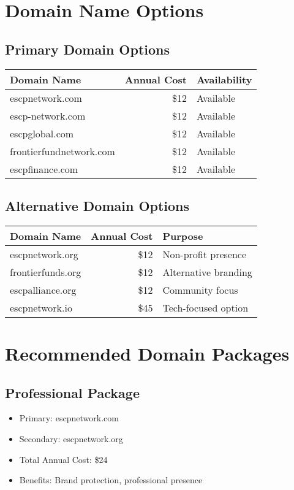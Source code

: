 \documentclass[11pt,a4paper]{article}
\begin{document}
\section{Domain Name Options}

\subsection{Primary Domain Options}
\begin{tcolorbox}[colback=white,colframe=primaryBlue!20]
\begin{tabular}{lrl}
\toprule
\textbf{Domain Name} & \textbf{Annual Cost} & \textbf{Availability} \\
\midrule
escpnetwork.com & \$12 & Available \\
escp-network.com & \$12 & Available \\
escpglobal.com & \$12 & Available \\
frontierfundnetwork.com & \$12 & Available \\
escpfinance.com & \$12 & Available \\
\bottomrule
\end{tabular}
\end{tcolorbox}

\subsection{Alternative Domain Options}
\begin{tcolorbox}[colback=white,colframe=primaryBlue!20]
\begin{tabular}{lrl}
\toprule
\textbf{Domain Name} & \textbf{Annual Cost} & \textbf{Purpose} \\
\midrule
escpnetwork.org & \$12 & Non-profit presence \\
frontierfunds.org & \$12 & Alternative branding \\
escpalliance.org & \$12 & Community focus \\
escpnetwork.io & \$45 & Tech-focused option \\
\bottomrule
\end{tabular}
\end{tcolorbox}

\section{Recommended Domain Packages}

\subsection{Professional Package}
\begin{tcolorbox}[colback=white,colframe=secondaryGreen!20]
\begin{itemize}[leftmargin=*]
    \item Primary: escpnetwork.com
    \item Secondary: escpnetwork.org
    \item Total Annual Cost: \$24
    \item Benefits: Brand protection, professional presence
\end{itemize}
\end{tcolorbox}
\end{document}
